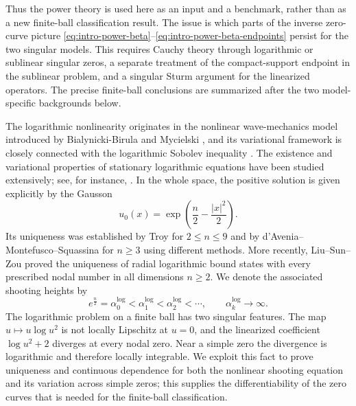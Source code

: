\documentclass[11pt]{article}
\begin{document}
{Thus the power theory is used here as an input and a benchmark, rather
than as a new finite-ball classification result.  The issue is which parts of
the inverse zero-curve picture
\eqref{eq:intro-power-beta}--\eqref{eq:intro-power-beta-endpoints} persist for
the two singular models.  This requires Cauchy theory through logarithmic or
sublinear singular zeros, a separate treatment of the compact-support
endpoint in the sublinear problem, and a singular Sturm argument for the
linearized operators.  The precise finite-ball conclusions are summarized
after the two model-specific backgrounds below.}

The logarithmic nonlinearity originates in the nonlinear wave-mechanics model introduced by Bialynicki-Birula and Mycielski \cite{BBM}, and its variational framework is closely connected with the logarithmic Sobolev inequality \cite{Gross,LL01}.
The existence and variational properties of stationary logarithmic equations
have been studied extensively; see, for instance, \cite{AJ20,LWZ26,S19,SquassinaSzulkin,TanakaZhang,WangZhang,WangZhangZhang}. In the whole space, the positive solution is given explicitly by the Gausson
\begin{equation}\label{eq:intro-gausson}
u_0(x)=\exp\left(\frac n2-\frac{|x|^2}{2}\right).
\end{equation}
Its uniqueness was established by Troy \cite{Troy} for $2\leq n\leq 9$ and by
d'Avenia--Montefusco--Squassina \cite{DMS} for $n\geq3$ using different methods.
More recently, Liu--Sun--Zou \cite{LiuSunZou} proved the uniqueness of
{radial logarithmic bound states with every prescribed nodal number} in
all dimensions $n\ge2$. We denote the associated shooting heights by
\begin{equation}\label{eq:alphak}
e^{\frac{n}{2}}=\alpha_0^{\log}
<\alpha_1^{\log}<\alpha_2^{\log}<\cdots,
\qquad \alpha_k^{\log}\to\infty.
\end{equation}
{The logarithmic problem on a finite ball has two singular
features.  The map $u\mapsto u\log u^2$ is not locally Lipschitz at $u=0$,
and the linearized coefficient $\log u^2+2$ diverges at every nodal zero.
Near a simple zero the divergence is logarithmic and therefore locally
integrable.  We exploit this fact to prove uniqueness and continuous
dependence for both the nonlinear shooting equation and its variation across
simple zeros; this supplies the differentiability of the zero curves that is
needed for the finite-ball classification.}
\end{document}
